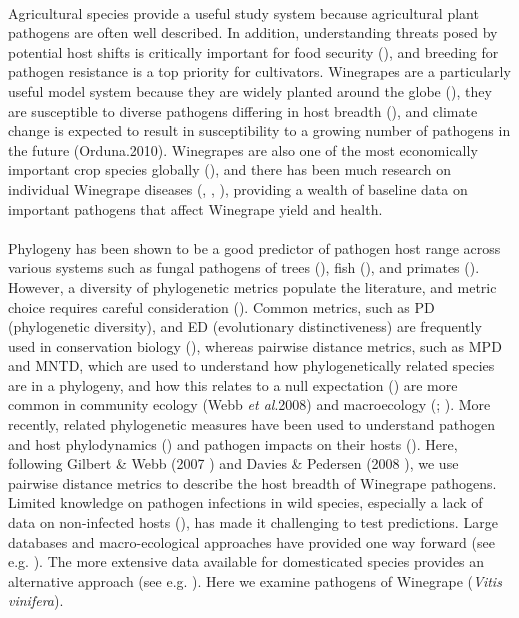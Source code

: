 \documentclass[12pt,letter]{article}
\begin{document}
\paragraph{}Agricultural species provide a useful study system because agricultural plant pathogens are often well described. In addition, understanding threats posed by potential host shifts is critically important for food security (\cite{Bommarco2013}), and breeding for pathogen resistance is a top priority for cultivators. Winegrapes are a particularly useful model system because they are widely planted around the globe (\cite{IOVW}), they are susceptible to diverse pathogens differing in host breadth (\cite{Armijo2016}), and climate change is expected to result in susceptibility to a growing number of pathogens in the future (Orduna.2010). Winegrapes are also one of the most economically important crop species globally (\cite{IOVW}), and there has been much research on individual Winegrape diseases (\cite{Armijo2016}, \cite{Zahavi2000}, \cite{Hopkins2002}), providing a wealth of baseline data on important pathogens that affect Winegrape yield and health. 

\paragraph{}Phylogeny has been shown to be a good predictor of pathogen host range across various systems such as fungal pathogens of trees (\cite{Gilbert2007}), fish (\cite{Poulin1995}), and primates (\cite{Davies2008}). However, a diversity of phylogenetic metrics populate the literature, and metric choice requires careful consideration (\cite{Tucker2017}). Common metrics, such as PD (phylogenetic diversity), and ED (evolutionary distinctiveness) are frequently used in conservation biology (\cite{Isaac2007}), whereas pairwise distance metrics, such as MPD and MNTD, which are used to understand how phylogenetically related species are in a phylogeny, and how this relates to a null expectation (\cite{Kembel2010}) are more common in community ecology (Webb \textit{et al}.2008) and macroecology (\cite{DaviesJonathan2011}; \cite{Tucker2017}). More recently, related phylogenetic measures have been used to understand pathogen and host phylodynamics (\cite{Fountain-Jones2017}) and pathogen impacts on their hosts (\cite{Farrell2019}). Here, following Gilbert & Webb (2007 \cite{Gilbert2007}) and Davies & Pedersen (2008 \cite{Davies2008}), we use pairwise distance metrics to describe the host breadth of Winegrape pathogens. Limited knowledge on pathogen infections in wild species, especially a lack of data on non-infected hosts (\cite{Parker2015a}), has made it challenging to test predictions. Large databases and macro-ecological approaches have provided one way forward (see e.g. \cite{Stephens2016}). The more extensive data available for domesticated species provides an alternative approach (see e.g. \cite{Farrell2019}). Here we examine pathogens of Winegrape (\textit{Vitis vinifera}).
\end{document}
